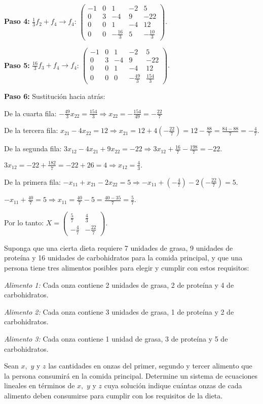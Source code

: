 \begin{myproof}
\textbf{Paso 4:} $\frac{1}{3}f_2 + f_4 \to f_4$: $\left(\begin{array}{cccc|c}
-1 & 0 & 1 & -2 & 5 \\
0 & 3 & -4 & 9 & -22 \\
0 & 0 & 1 & -4 & 12 \\
0 & 0 & -\frac{16}{3} & 5 & -\frac{10}{3}
\end{array}\right).$

\textbf{Paso 5:} $\frac{16}{3}f_3 + f_4 \to f_4$: $\left(\begin{array}{cccc|c}
-1 & 0 & 1 & -2 & 5 \\
0 & 3 & -4 & 9 & -22 \\
0 & 0 & 1 & -4 & 12 \\
0 & 0 & 0 & -\frac{49}{3} & \frac{154}{3}
\end{array}\right).$

\textbf{Paso 6:} Sustitución hacia atrás:

De la cuarta fila: $-\frac{49}{3}x_{22} = \frac{154}{3} \Rightarrow x_{22} = -\frac{154}{49} = -\frac{22}{7}$

De la tercera fila: $x_{21} - 4x_{22} = 12 \Rightarrow x_{21} = 12 + 4(-\frac{22}{7}) = 12 - \frac{88}{7} = \frac{84-88}{7} = -\frac{4}{7}.$

De la segunda fila: $3x_{12} - 4x_{21} + 9x_{22} = -22\Rightarrow 3x_{12} + \frac{16}{7} - \frac{198}{7} = -22.$

$3x_{12} = -22 + \frac{182}{7} = -22 + 26 = 4\Rightarrow x_{12} = \frac{4}{3}.$

De la primera fila: $-x_{11} + x_{21} - 2x_{22} = 5\Rightarrow -x_{11} + (-\frac{4}{7}) - 2(-\frac{22}{7}) = 5.$

$-x_{11} + \frac{40}{7} = 5\Rightarrow x_{11} = \frac{40}{7} - 5 = \frac{40-35}{7} = \frac{5}{7}.$

Por lo tanto: $X = \left( \begin{array}{cc}
\frac{5}{7} & \frac{4}{3} \\
-\frac{4}{7} & -\frac{22}{7}
\end{array} \right).$
\end{myproof}

\begin{prob}
Suponga que una cierta dieta requiere 7 unidades de grasa, 9 unidades de proteína y 16 unidades de carbohidratos para la comida principal, y que una persona tiene tres alimentos posibles para elegir y cumplir con estos requisitos:

\textit{Alimento 1:} Cada onza contiene 2 unidades de grasa, 2 de proteína y 4 de carbohidratos.

\textit{Alimento 2:} Cada onza contiene 3 unidades de grasa, 1 de proteína y 2 de carbohidratos.

\textit{Alimento 3:} Cada onza contiene 1 unidad de grasa, 3 de proteína y 5 de carbohidratos.

Sean $x,$ $y$ y $z$ las cantidades en onzas del primer, segundo y tercer alimento que la persona consumirá en la comida principal. Determine un sistema de ecuaciones lineales en términos de $x,$ $y$ y $z$ cuya solución indique cuántas onzas de cada alimento deben consumirse para cumplir con los requisitos de la dieta.
\end{prob}

